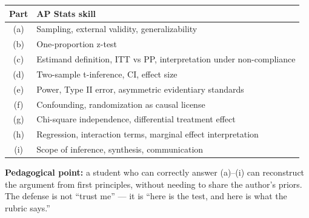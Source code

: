 \documentclass[11pt]{article}
\begin{document}
\begin{center}
\small
\begin{tabular}{cl}
\toprule
Part & AP Stats skill \\
\midrule
(a) & Sampling, external validity, generalizability \\
(b) & One-proportion z-test \\
(c) & Estimand definition, ITT vs PP, interpretation under non-compliance \\
(d) & Two-sample t-inference, CI, effect size \\
(e) & Power, Type II error, asymmetric evidentiary standards \\
(f) & Confounding, randomization as causal license \\
(g) & Chi-square independence, differential treatment effect \\
(h) & Regression, interaction terms, marginal effect interpretation \\
(i) & Scope of inference, synthesis, communication \\
\bottomrule
\end{tabular}
\end{center}

\vspace{1em}
\begin{notebox}
\textbf{Pedagogical point:} a student who can correctly answer
(a)--(i) can reconstruct the argument from first principles, without
needing to share the author's priors. The defense is not ``trust me''
--- it is ``here is the test, and here is what the rubric says.''
\end{notebox}
\end{document}
